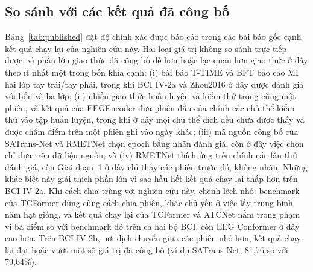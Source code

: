 \documentclass[preprint,12pt]{elsarticle}
\begin{document}
\subsection{So sánh với các kết quả đã công bố}
\label{subsec:published}

Bảng~\ref{tab:published} đặt độ chính xác được báo cáo trong các bài báo gốc cạnh kết quả chạy lại của nghiên cứu này. Hai loại giá trị không so sánh trực tiếp được, vì phần lớn giao thức đã công bố dễ hơn hoặc lạc quan hơn giao thức ở đây theo ít nhất một trong bốn khía cạnh: (i) bài báo T-TIME và BFT báo cáo MI hai lớp tay trái/tay phải, trong khi BCI IV-2a và Zhou2016 ở đây được đánh giá với bốn và ba lớp; (ii) nhiều giao thức huấn luyện và kiểm thử trong cùng một phiên, và kết quả của EEGEncoder đưa phiên đầu của chính các chủ thể kiểm thử vào tập huấn luyện, trong khi ở đây mọi chủ thể đích đều chưa được thấy và được chấm điểm trên một phiên ghi vào ngày khác; (iii) mã nguồn công bố của SATrans-Net và RMETNet chọn epoch bằng nhãn đánh giá, còn ở đây việc chọn chỉ dựa trên dữ liệu nguồn; và (iv) RMETNet thích ứng trên chính các lần thử đánh giá, còn Giai đoạn~1 ở đây chỉ thấy các phiên trước đó, không nhãn. Những khác biệt này giải thích phần lớn vì sao hầu hết kết quả chạy lại thấp hơn trên BCI IV-2a. Khi cách chia trùng với nghiên cứu này, chênh lệch nhỏ: benchmark của TCFormer \cite{altaheri2025tcformer} dùng cùng cách chia phiên, khác chủ yếu ở việc lấy trung bình năm hạt giống, và kết quả chạy lại của TCFormer và ATCNet nằm trong phạm vi ba điểm so với benchmark đó trên cả hai bộ BCI, còn EEG Conformer ở đây cao hơn. Trên BCI IV-2b, nơi dịch chuyển giữa các phiên nhỏ hơn, kết quả chạy lại đạt hoặc vượt một số giá trị đã công bố (ví dụ SATrans-Net, 81,76 so với 79,64\%).
\end{document}
